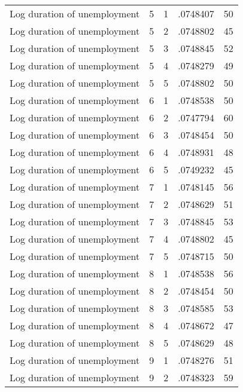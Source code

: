 \begin{tabular}{l*{4}{c}}
Log duration of unemployment&           5&           1&    .0748407&          50\\
Log duration of unemployment&           5&           2&    .0748802&          45\\
Log duration of unemployment&           5&           3&    .0748845&          52\\
Log duration of unemployment&           5&           4&    .0748279&          49\\
Log duration of unemployment&           5&           5&    .0748802&          50\\
Log duration of unemployment&           6&           1&    .0748538&          50\\
Log duration of unemployment&           6&           2&    .0747794&          60\\
Log duration of unemployment&           6&           3&    .0748454&          50\\
Log duration of unemployment&           6&           4&    .0748931&          48\\
Log duration of unemployment&           6&           5&    .0749232&          45\\
Log duration of unemployment&           7&           1&    .0748145&          56\\
Log duration of unemployment&           7&           2&    .0748629&          51\\
Log duration of unemployment&           7&           3&    .0748845&          53\\
Log duration of unemployment&           7&           4&    .0748802&          45\\
Log duration of unemployment&           7&           5&    .0748715&          50\\
Log duration of unemployment&           8&           1&    .0748538&          56\\
Log duration of unemployment&           8&           2&    .0748454&          50\\
Log duration of unemployment&           8&           3&    .0748585&          53\\
Log duration of unemployment&           8&           4&    .0748672&          47\\
Log duration of unemployment&           8&           5&    .0748629&          48\\
Log duration of unemployment&           9&           1&    .0748276&          51\\
Log duration of unemployment&           9&           2&    .0748323&          59\\

\end{tabular}
